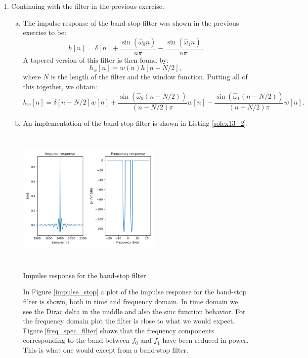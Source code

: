 \begin{enumerate}
  \item Continuing with the filter in the previous exercise.

        \begin{enumerate}[a)]
          \item The impulse response of the band-stop filter was shown in the previous exercise to be:
                \[ h[n] = \delta[n] + \frac{\sin(\hat{\omega}_{0}n)}{n\pi} - \frac{\sin(\hat{\omega}_{1}n)}{n\pi}. \]
                A tapered version of this filter is then found by:
                \[ h_{w}[n] = w(n)h[n - N/2], \]
                where $N$ is the length of the filter and the window function. Putting all of this together, we obtain:
                \[ h_{w}[n] = \delta[n-N/2]w[n] + \frac{\sin(\hat{\omega}_{0}(n-N/2))}{(n-N/2)\pi}w[n] - \frac{\sin(\hat{\omega}_{1}(n-N/2))}{(n-N/2)\pi}w[n]. \]

          \item An implementation of the band-stop filter is shown in Listing \ref{solex13_2}.

                
                \begin{marginfigure}
                  \includegraphics[width=7.0cm, height=6.8cm]{ch13/figures/impulse_response.png}
                  \caption{Impulse response for the band-stop filter}
                  \label{impulse_stop}
                \end{marginfigure}

                In Figure \ref{impulse_stop} a plot of the impulse response for the band-stop filter is shown, both in time and frequency domain.
                In time domain we see the Dirac delta in the middle and also the sinc function behavior.
                For the frequency domain plot the filter is close to what we would expect. Figure \ref{freq_spec_filter} shows that the
                frequency components corresponding to the band between $f_{0}$ and $f_{1}$ have been
                reduced in power. This is what one would except from a band-stop filter.


\end{enumerate}
\end{enumerate}
